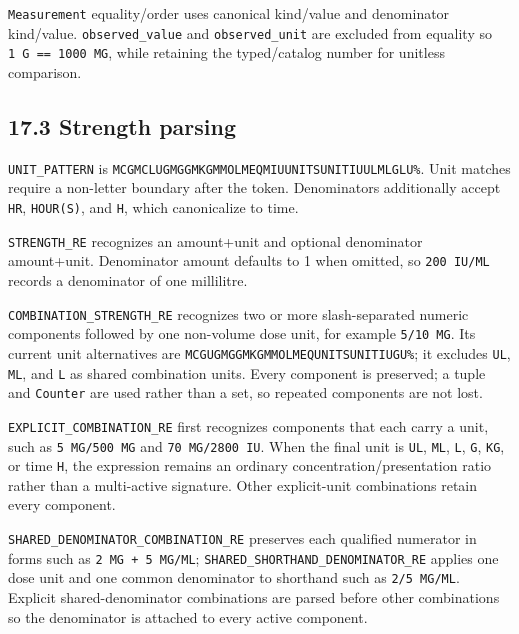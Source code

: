 \texttt{Measurement} equality/order uses canonical kind/value and denominator kind/value. \texttt{observed\_\allowbreak{}value} and \texttt{observed\_\allowbreak{}unit} are excluded from equality so \texttt{1\ G\ ==\ 1000\ MG}, while retaining the typed/catalog number for unitless comparison.

\subsection{17.3 Strength parsing}\label{173-strength-parsing}

\texttt{UNIT\_\allowbreak{}PATTERN} is \texttt{MCG\textbar{}MCL\textbar{}UG\textbar{}MG\textbar{}GM\textbar{}KG\textbar{}MMOL\textbar{}MEQ\textbar{}MIU\textbar{}UNITS\textbar{}UNIT\textbar{}IU\textbar{}UL\textbar{}ML\textbar{}G\textbar{}L\textbar{}U\textbar{}\%}. Unit matches require a non-letter boundary after the token. Denominators additionally accept \texttt{HR}, \texttt{HOUR(S)}, and \texttt{H}, which canonicalize to time.

\texttt{STRENGTH\_\allowbreak{}RE} recognizes an amount+unit and optional denominator amount+unit. Denominator amount defaults to 1 when omitted, so \texttt{200\ IU/ML} records a denominator of one millilitre.

\texttt{COMBINATION\_\allowbreak{}STRENGTH\_\allowbreak{}RE} recognizes two or more slash-separated numeric components followed by one non-volume dose unit, for example \texttt{5/10\ MG}. Its current unit alternatives are \texttt{MCG\textbar{}UG\textbar{}MG\textbar{}GM\textbar{}KG\textbar{}MMOL\textbar{}MEQ\textbar{}UNITS\textbar{}UNIT\textbar{}IU\textbar{}G\textbar{}U\textbar{}\%}; it excludes \texttt{UL}, \texttt{ML}, and \texttt{L} as shared combination units. Every component is preserved; a tuple and \texttt{Counter} are used rather than a set, so repeated components are not lost.

\texttt{EXPLICIT\_\allowbreak{}COMBINATION\_\allowbreak{}RE} first recognizes components that each carry a unit, such as \texttt{5\ MG/500\ MG} and \texttt{70\ MG/2800\ IU}. When the final unit is \texttt{UL}, \texttt{ML}, \texttt{L}, \texttt{G}, \texttt{KG}, or time \texttt{H}, the expression remains an ordinary concentration/presentation ratio rather than a multi-active signature. Other explicit-unit combinations retain every component.

\texttt{SHARED\_\allowbreak{}DENOMINATOR\_\allowbreak{}COMBINATION\_\allowbreak{}RE} preserves each qualified numerator in forms such as \texttt{2\ MG\ +\ 5\ MG/ML}; \texttt{SHARED\_\allowbreak{}SHORTHAND\_\allowbreak{}DENOMINATOR\_\allowbreak{}RE} applies one dose unit and one common denominator to shorthand such as \texttt{2/5\ MG/ML}. Explicit shared-denominator combinations are parsed before other combinations so the denominator is attached to every active component.

